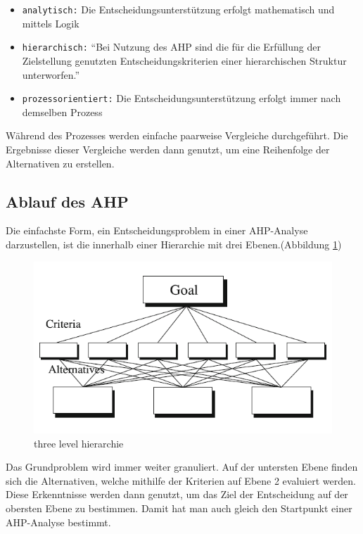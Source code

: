 \begin{itemize}
	\item\texttt{analytisch:} Die Entscheidungsunterstützung erfolgt mathematisch und mittels Logik
	\item\texttt{hierarchisch:} \enquote{Bei Nutzung des AHP sind die für die Erfüllung der Zielstellung genutzten Entscheidungskriterien einer hierarchischen Struktur unterworfen.}\autocite[S.314]{Hausladen.2016} 
	\item\texttt{prozessorientiert:} Die Entscheidungsunterstützung erfolgt immer nach demselben Prozess
\end{itemize}
Während des Prozesses werden einfache paarweise Vergleiche durchgeführt. Die Ergebnisse dieser Vergleiche werden dann genutzt, um eine Reihenfolge der Alternativen zu erstellen.\autocite[Vgl.][S.1]{Saaty.2012}
\subsection{Ablauf des AHP}
Die einfachste Form, ein Entscheidungsproblem in einer AHP-Analyse darzustellen, ist die innerhalb einer Hierarchie mit drei Ebenen.(Abbildung \ref{img:hier})
\begin{figure}[h!]
	\centering
	\includegraphics[scale = 0.8]{img/Hierarchie.png}
	\caption{three level hierarchie}
	\label{img:hier}
\end{figure}
Das Grundproblem wird immer weiter granuliert. Auf der untersten Ebene finden sich die Alternativen, welche mithilfe der Kriterien auf Ebene 2 evaluiert werden. Diese Erkenntnisse werden dann genutzt, um das Ziel der Entscheidung auf der obersten Ebene zu bestimmen.\autocite[Vgl.][S.2]{Saaty.2012}
Damit hat man auch gleich den Startpunkt einer AHP-Analyse bestimmt. 
